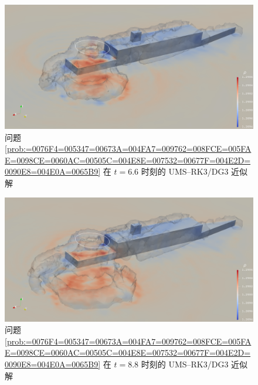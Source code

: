 \begin{figure}[h!]
\begin{centering}
\includegraphics[width=1\textwidth,height=0.28\textheight,keepaspectratio]{figures/ship/a=45_p=3/Frame66}
\par\end{centering}
\caption{\label{fig:ship_a=00003D45_t=00003D66e-1_p=00003D3}问题 \ref{prob:=0076F4=005347=00673A=004FA7=009762=008FCE=005FAE=0098CE=0060AC=00505C=004E8E=007532=00677F=004E2D=0090E8=004E0A=0065B9}
在 $t=6.6$ 时刻的 UMS–RK3/DG3 近似解}
\end{figure}

\begin{figure}[h!]
\begin{centering}
\includegraphics[width=1\textwidth,height=0.28\textheight,keepaspectratio]{figures/ship/a=45_p=3/Frame88}
\par\end{centering}
\caption{\label{fig:ship_a=00003D45_t=00003D88e-1_p=00003D3}问题 \ref{prob:=0076F4=005347=00673A=004FA7=009762=008FCE=005FAE=0098CE=0060AC=00505C=004E8E=007532=00677F=004E2D=0090E8=004E0A=0065B9}
在 $t=8.8$ 时刻的 UMS–RK3/DG3 近似解}
\end{figure}


